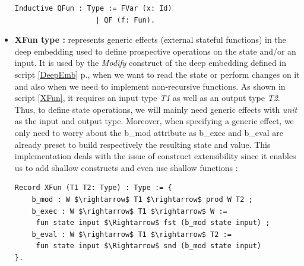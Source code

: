 \begin{itemize}
\begin{lstlisting}[caption = {Quasi-functions in the deep embedding},xleftmargin=.08\textwidth,
xrightmargin=.14\textwidth]
Inductive QFun : Type := FVar (x: Id) 
	               | QF (f: Fun).
\end{lstlisting}
	\item \textbf{XFun type :} represents generic effects (external stateful functions) in the deep embedding used to define prospective operations on the state and/or an input. It is used by the \textit{Modify} construct of the deep embedding defined in script \ref{DeepEmb} p.\pageref{DeepEmb}, when we want to read the state or perform changes on it and also when we need to implement non-recursive functions. As shown in script \ref{XFun}, it requires an input type \textit{T1} as well as an output type \textit{T2}. Thus, to define state operations, we will mainly need generic effects with \textit{unit} as the input and output type. Moreover, when specifying a generic effect, we only need to worry about the b\_mod attribute as b\_exec and b\_eval are already preset to build respectively the resulting state and value. This implementation deals with the issue of construct extensibility since it enables us to add shallow constructs and even use shallow functions :
\begin{lstlisting}[caption = {generic effects in the deep embedding}, label={XFun}, mathescape=true,xleftmargin=.02\textwidth,
xrightmargin=.02\textwidth]
Record XFun (T1 T2: Type) : Type := {
    b_mod : W $\rightarrow$ T1 $\rightarrow$ prod W T2 ;
    b_exec : W $\rightarrow$ T1 $\rightarrow$ W := 
     fun state input $\Rightarrow$ fst (b_mod state input) ;
    b_eval : W $\rightarrow$ T1 $\rightarrow$ T2 := 
     fun state input $\Rightarrow$ snd (b_mod state input) 
}.       
\end{lstlisting}
\end{itemize}

